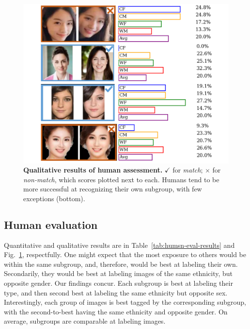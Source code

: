 \begin{figure}[t!] 
	\centering    
	\includegraphics[width=\linewidth] {images/human_eval.pdf}
		\caption{\small{\textbf{Qualitative results of human assessment.} $\checkmark$ for \emph{match}; $\times$ for \emph{non-match}, which scores plotted next to each. Humans tend to be more successful at recognizing their own subgroup, with few exceptions (bottom). }}
		\label{fig:human-eval} 
		\vspace{-5mm}
\end{figure} 
\vspace{-2mm}
\subsection{Human evaluation}
 Quantitative and qualitative results are in Table~\ref{tab:humsn-eval-results} and Fig.~\ref{fig:human-eval}, respectfully. One might expect that the most exposure to others would be within the same subgroup, and, therefore, would be best at labeling their own. Secondarily, they would be best at labeling images of the same ethnicity, but opposite gender. Our findings concur. Each subgroup is best at labeling their type, and then second best at labeling the same ethnicity but opposite sex. Interestingly, each group of images is best tagged by the corresponding subgroup, with the second-to-best having the same ethnicity and opposite gender. On average, subgroups are comparable at labeling images. 




